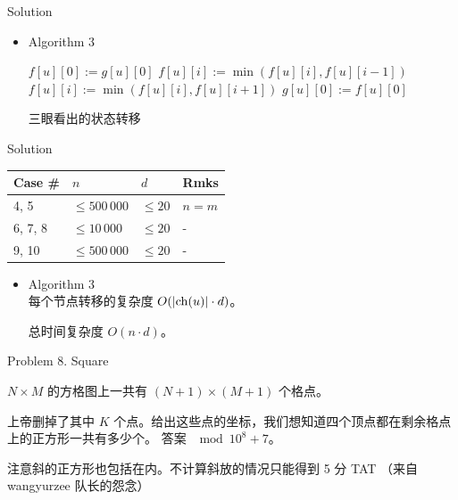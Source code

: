 \documentclass[UTF8]{beamer}
\begin{document}
\begin{frame}{Solution}

\begin{itemize}
    \item Algorithm 3 \\
        \begin{algorithm}[H]
        \begin{algorithmic}[1]
            \STATE $f[u][0] := g[u][0]$
                \STATE $f[u][i] := \min(f[u][i], f[u][i - 1])$
            \ENDFOR
                    \STATE $f[u][i] := \min(f[u][i], f[u][i + 1])$
                \ENDIF
            \ENDFOR
            \STATE $g[u][0] := f[u][0]$
        \end{algorithmic}
        \caption{三眼看出的状态转移}
        \label{alg:seq}
        \end{algorithm}
\end{itemize}

\end{frame}

\begin{frame}{Solution}

\begin{tabularx}{\textwidth}{X|X|X|X} \hline
Case \# & $n$ & $d$ & Rmks \\ \hline \hline
4, 5    & $\leq 500\,000$ & $\leq 20$ & $n = m$ \\ \hline
6, 7, 8 & $\leq 10\,000$  & $\leq 20$ & - \\ \hline
9, 10   & $\leq 500\,000$ & $\leq 20$ & - \\ \hline
\end{tabularx}
\begin{itemize}
    \item Algorithm 3 \\
        每个节点转移的复杂度 $O(|{\rm ch}(u)| \cdot d)$。

        总时间复杂度 $O(n \cdot d)$。
\end{itemize}

\end{frame}


\begin{frame}{Problem 8. Square}

$N \times M$ 的方格图上一共有 $(N + 1) \times (M + 1)$ 个格点。

上帝删掉了其中 $K$ 个点。给出这些点的坐标，我们想知道四个顶点都在剩余格点上的正方形一共有多少个。
答案 $\mod 10^8 + 7$。

注意斜的正方形也包括在内。不计算斜放的情况只能得到 5 分 TAT （来自 wangyurzee 队长的怨念）

\end{frame}
\end{document}
